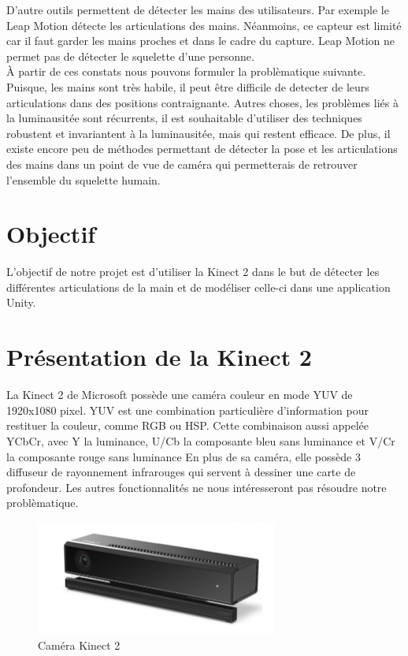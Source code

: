 D'autre outils permettent de détecter les mains des utilisateurs. Par exemple le Leap Motion détecte les articulations des mains. Néanmoins,
ce capteur est limité car il faut garder les mains proches et dans le 
cadre du capture. Leap Motion ne permet pas de détecter le squelette 
d'une personne.\\

À partir de ces constats nous pouvons formuler la problèmatique 
suivante. Puisque, 
les mains sont très habile, il peut être difficile de detecter de leurs 
articulations dans des positions contraignante. Autres choses, les 
problèmes liés à la luminausitée sont récurrents, il est souhaitable 
d'utiliser des techniques robustent et invariantent à la luminausitée, 
mais qui restent efficace. De plus, il existe encore peu de méthodes 
permettant de détecter la pose et les articulations des mains dans 
un point de vue de caméra qui permetterais de retrouver l'ensemble du
squelette humain.  

\section{Objectif}
L'objectif de notre projet est d'utiliser la Kinect 2 dans le but de détecter les différentes articulations
de la main et de modéliser celle-ci dans une application Unity.

\section{Présentation de la Kinect 2}
La Kinect 2 de Microsoft possède une caméra couleur en mode YUV de 1920x1080 pixel.
YUV est une combination particulière d'information pour restituer la couleur, comme RGB ou HSP.
Cette combinaison aussi appelée YCbCr, avec Y la luminance, U/Cb la composante bleu sans luminance et V/Cr la composante rouge sans luminance
En plus de sa caméra, elle possède 3 diffuseur de rayonnement infrarouges qui servent à dessiner une carte de profondeur.
Les autres fonctionnalités ne nous intéresseront pas résoudre notre problèmatique.\\

\begin{figure}[H]
 \center
 \includegraphics[width=300px]{images/kinect-v2.png}
 \caption{Caméra Kinect 2}
\end{figure}

